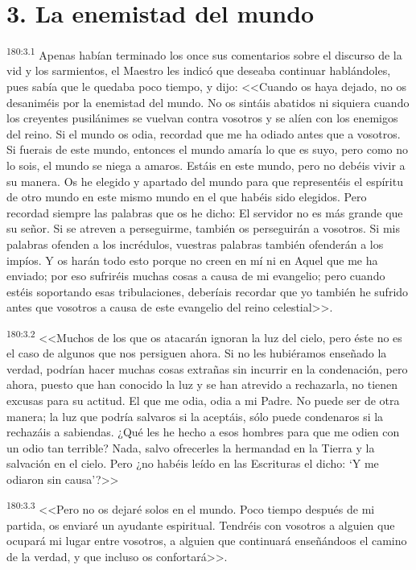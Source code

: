 \section*{3. La enemistad del mundo}
\par 
\textsuperscript{180:3.1} Apenas habían terminado los once sus comentarios sobre el discurso de la vid y los sarmientos, el Maestro les indicó que deseaba continuar hablándoles, pues sabía que le quedaba poco tiempo, y dijo: <<Cuando os haya dejado, no os desaniméis por la enemistad del mundo. No os sintáis abatidos ni siquiera cuando los creyentes pusilánimes se vuelvan contra vosotros y se alíen con los enemigos del reino. Si el mundo os odia, recordad que me ha odiado antes que a vosotros. Si fuerais de este mundo, entonces el mundo amaría lo que es suyo, pero como no lo sois, el mundo se niega a amaros. Estáis en este mundo, pero no debéis vivir a su manera. Os he elegido y apartado del mundo para que representéis el espíritu de otro mundo en este mismo mundo en el que habéis sido elegidos. Pero recordad siempre las palabras que os he dicho: El servidor no es más grande que su señor. Si se atreven a perseguirme, también os perseguirán a vosotros. Si mis palabras ofenden a los incrédulos, vuestras palabras también ofenderán a los impíos. Y os harán todo esto porque no creen en mí ni en Aquel que me ha enviado; por eso sufriréis muchas cosas a causa de mi evangelio; pero cuando estéis soportando esas tribulaciones, deberíais recordar que yo también he sufrido antes que vosotros a causa de este evangelio del reino celestial>>.

\par 
\textsuperscript{180:3.2} <<Muchos de los que os atacarán ignoran la luz del cielo, pero éste no es el caso de algunos que nos persiguen ahora. Si no les hubiéramos enseñado la verdad, podrían hacer muchas cosas extrañas sin incurrir en la condenación, pero ahora, puesto que han conocido la luz y se han atrevido a rechazarla, no tienen excusas para su actitud. El que me odia, odia a mi Padre. No puede ser de otra manera; la luz que podría salvaros si la aceptáis, sólo puede condenaros si la rechazáis a sabiendas. ¿Qué les he hecho a esos hombres para que me odien con un odio tan terrible? Nada, salvo ofrecerles la hermandad en la Tierra y la salvación en el cielo. Pero ¿no habéis leído en las Escrituras el dicho: `Y me odiaron sin causa'?>>

\par 
\textsuperscript{180:3.3} <<Pero no os dejaré solos en el mundo. Poco tiempo después de mi partida, os enviaré un ayudante espiritual. Tendréis con vosotros a alguien que ocupará mi lugar entre vosotros, a alguien que continuará enseñándoos el camino de la verdad, y que incluso os confortará>>.

